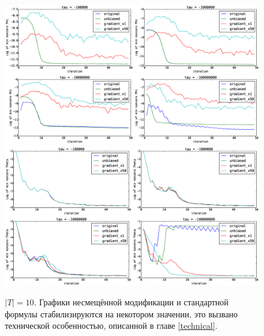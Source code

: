 \documentclass[12pt]{article}
\begin{document}
\begin{figure}[H]
	\centering
	\caption{$|T| = 10$. Графики несмещённой модификации и стандартной формулы стабилизируются на некотором значении, это вызвано технической особенностью, описанной в главе \ref{technical}.}    
	\includegraphics[width=1.0\linewidth]{pictures/topics_10_minPhi_values}
	\includegraphics[width=1.0\linewidth]{pictures/topics_10_minTheta_values}
\end{figure}
\end{document}
